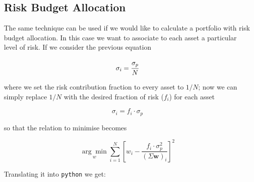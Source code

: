 \subsection{Risk Budget Allocation}
\label{risk-budget-allocation}

The same technique can be used if we would like to calculate a portfolio
with risk budget allocation. In this case we want to associate to each asset a particular level of risk. If we consider the previous equation

\[ \sigma _{i}=\cfrac{\sigma_p}{N} \]

where we set the risk contribution fraction to every asset to \(1/N\);
now we can simply replace \(1/N\) with the desired fraction of risk (\(f_i\))
for each asset

\[ \sigma _{i}=f_i \cdot \sigma_p \]

so that the relation to minimise becomes

\[ \underset{w}{\arg \min } \sum _{i=1}^{N}\left[w_{i}-{\frac {f_i \cdot \sigma_p^{2}}{(\Sigma \mathbf{w})_{i}}}\right]^{2} \]

Translating it into \texttt{python} we get:

